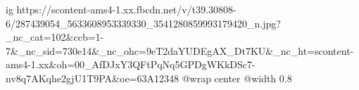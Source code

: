  
 
 
 
 

\ifcmt
  ig https://scontent-ams4-1.xx.fbcdn.net/v/t39.30808-6/287439054_5633608953339330_3541280859993179420_n.jpg?_nc_cat=102&ccb=1-7&_nc_sid=730e14&_nc_ohc=9eT2daYUDEgAX_Dt7KU&_nc_ht=scontent-ams4-1.xx&oh=00_AfDJxY3QFtPqNq5GPDgWKkDSc7-nv8q7AKqhe2gjU1T9PA&oe=63A12348
  @wrap center
  @width 0.8
\fi
